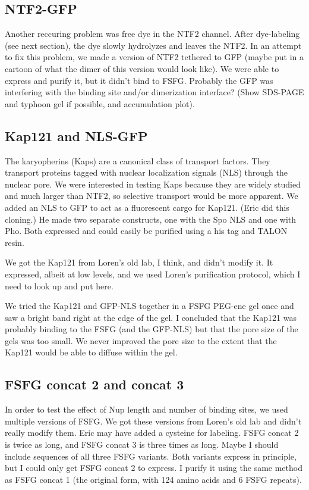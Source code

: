 \subsection{NTF2-GFP}
Another reccuring problem was free dye in the NTF2 channel.  After dye-labeling (see next section), the dye slowly hydrolyzes and leaves the NTF2.  In an attempt to fix this problem, we made a version of NTF2 tethered to GFP (maybe put in a cartoon of what the dimer of this version would look like).  We were able to express and purify it, but it didn't bind to FSFG.  Probably the GFP was interfering with the binding site and/or dimerization interface?  (Show SDS-PAGE and typhoon gel if possible, and accumulation plot).
\subsection{Kap121 and NLS-GFP}
The karyopherins (Kaps) are a canonical class of transport factors.  They transport proteins tagged with nuclear localization signals (NLS) through the nuclear pore.  We were interested in testing Kaps because they are widely studied and much larger than NTF2, so selective transport would be more apparent.  We added an NLS to GFP to act as a fluorescent cargo for  Kap121.  (Eric did this cloning.)  He made two separate constructs, one with the Spo NLS and one with Pho.  Both expressed and could easily be purified using a his tag and TALON resin.

We got the Kap121 from Loren's old lab, I think, and didn't modify it.  It expressed, albeit at low levels, and we used Loren's purification protocol, which I need to look up and put here.

We tried the Kap121 and GFP-NLS together in a FSFG PEG-ene gel once and saw a bright band right at the edge of the gel.  I concluded that the Kap121 was probably binding to the FSFG (and the GFP-NLS) but that the pore size of the gels was too small.  We never improved the pore size to the extent that the Kap121 would be able to diffuse within the gel.

\subsection{FSFG concat 2 and concat 3}
In order to test the effect of Nup length and number of binding sites, we used multiple versions of FSFG.  We got these versions from Loren's old lab and didn't really modify them.  Eric may have added a cysteine for labeling.  FSFG concat 2 is twice as long, and FSFG concat 3 is three times as long.  Maybe I should include sequences of all three FSFG variants.  Both variants express in principle, but I could only get FSFG concat 2 to express.  I purify it using the same method as FSFG concat 1 (the original form, with 124 amino acids and 6 FSFG repeats).  

